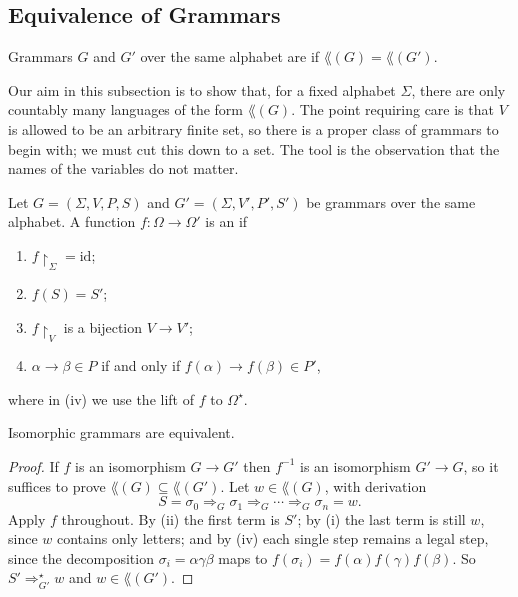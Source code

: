 \subsection{Equivalence of Grammars}

\begin{definition}
	Grammars $G$ and $G'$ over the same alphabet are  if $\lang(G) = \lang(G')$.
\end{definition}

Our aim in this subsection is to show that, for a fixed alphabet $\Sigma$, there are only countably many languages of the form $\lang(G)$. The point requiring care is that $V$ is allowed to be an arbitrary finite set, so there is a proper class of grammars to begin with; we must cut this down to a set. The tool is the observation that the names of the variables do not matter.

\begin{definition}
	Let $G = (\Sigma, V, P, S)$ and $G' = (\Sigma, V', P', S')$ be grammars over the same alphabet. A function $f \colon \Omega \to \Omega'$ is an  if
	\begin{enumerate}[label=(\roman*)]
		\item $f\restriction_\Sigma = \mathrm{id}$;
		\item $f(S) = S'$;
		\item $f\restriction_V$ is a bijection $V \to V'$;
		\item $\alpha \to \beta \in P$ if and only if $f(\alpha) \to f(\beta) \in P'$,
	\end{enumerate}
	where in (iv) we use the lift of $f$ to $\Omega^\star$.
\end{definition}

\begin{proposition}
	Isomorphic grammars are equivalent.
\end{proposition}

\begin{proof}
	If $f$ is an isomorphism $G \to G'$ then $f^{-1}$ is an isomorphism $G' \to G$, so it suffices to prove $\lang(G) \subseteq \lang(G')$. Let $w \in \lang(G)$, with derivation
	$$S = \sigma_0 \Rightarrow_G \sigma_1 \Rightarrow_G \cdots \Rightarrow_G \sigma_n = w.$$
	Apply $f$ throughout. By (ii) the first term is $S'$; by (i) the last term is still $w$, since $w$ contains only letters; and by (iv) each single step remains a legal step, since the decomposition $\sigma_i = \alpha\gamma\beta$ maps to $f(\sigma_i) = f(\alpha)f(\gamma)f(\beta)$. So $S' \Rightarrow_{G'}^\star w$ and $w \in \lang(G')$.
\end{proof}

